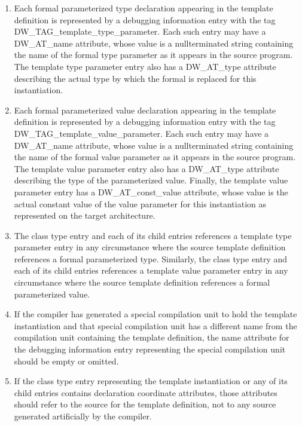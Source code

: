 \begin{enumerate}[1.]
\item Each formal parameterized type declaration appearing in the
template definition is represented by a debugging information
entry with the tag DW\_TAG\_template\_type\_parameter. Each
such entry may have a DW\_AT\_name attribute, whose value is
a null\dash terminated string containing the name of the formal
type parameter as it appears in the source program. The
template type parameter entry also has a DW\_AT\_type attribute
describing the actual type by which the formal is replaced
for this instantiation.

\item Each formal parameterized value declaration appearing in the
template definition is represented by a debugging information
entry with the tag DW\_TAG\_template\_value\_parameter. Each
such entry may have a DW\_AT\_name attribute, whose value is
a null\dash terminated string containing the name of the formal
value parameter as it appears in the source program. The
template value parameter entry also has a DW\_AT\_type attribute
describing the type of the parameterized value. Finally,
the template value parameter entry has a DW\_AT\_const\_value
attribute, whose value is the actual constant value of the
value parameter for this instantiation as represented on the
target architecture.

\item The class type entry and each of its child entries references
a template type parameter entry in any circumstance where the
source template definition references a formal parameterized
type. Similarly, the class type entry and each of its child
entries references a template value parameter entry in any
circumstance where the source template definition references
a formal parameterized value.

\item If the compiler has generated a special compilation unit to
hold the template instantiation and that special compilation
unit has a different name from the compilation unit containing
the template definition, the name attribute for the debugging
information entry representing the special compilation unit
should be empty or omitted.

\item If the class type entry representing the template
instantiation or any of its child entries contains declaration
coordinate attributes, those attributes should refer to
the source for the template definition, not to any source
generated artificially by the compiler.
\end{enumerate}


